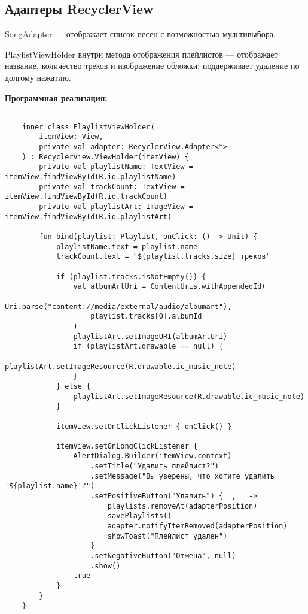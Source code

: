 \subsection{Адаптеры RecyclerView}

SongAdapter — отображает список песен с возможностью мультивыбора.

PlaylistViewHolder внутри метода отображения плейлистов — отображает название, количество треков и изображение обложки; поддерживает удаление по долгому нажатию.

\textbf{Программная реализация:}
\begin{verbatim}

	inner class PlaylistViewHolder(
        itemView: View,
        private val adapter: RecyclerView.Adapter<*>
    ) : RecyclerView.ViewHolder(itemView) {
        private val playlistName: TextView = itemView.findViewById(R.id.playlistName)
        private val trackCount: TextView = itemView.findViewById(R.id.trackCount)
        private val playlistArt: ImageView = itemView.findViewById(R.id.playlistArt)

        fun bind(playlist: Playlist, onClick: () -> Unit) {
            playlistName.text = playlist.name
            trackCount.text = "${playlist.tracks.size} треков"

            if (playlist.tracks.isNotEmpty()) {
                val albumArtUri = ContentUris.withAppendedId(
                    Uri.parse("content://media/external/audio/albumart"),
                    playlist.tracks[0].albumId
                )
                playlistArt.setImageURI(albumArtUri)
                if (playlistArt.drawable == null) {
                    playlistArt.setImageResource(R.drawable.ic_music_note)
                }
            } else {
                playlistArt.setImageResource(R.drawable.ic_music_note)
            }

            itemView.setOnClickListener { onClick() }

            itemView.setOnLongClickListener {
                AlertDialog.Builder(itemView.context)
                    .setTitle("Удалить плейлист?")
                    .setMessage("Вы уверены, что хотите удалить '${playlist.name}'?")
                    .setPositiveButton("Удалить") { _, _ ->
                        playlists.removeAt(adapterPosition)
                        savePlaylists()
                        adapter.notifyItemRemoved(adapterPosition)
                        showToast("Плейлист удален")
                    }
                    .setNegativeButton("Отмена", null)
                    .show()
                true
            }
        }
    }


\end{verbatim}
